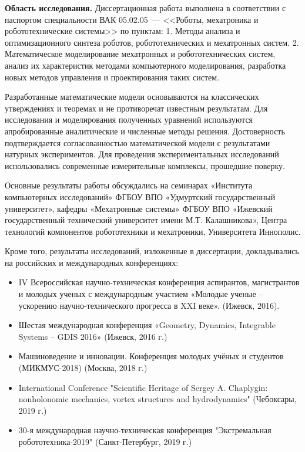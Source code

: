 \textbf{Область исследования.} Диссертационная работа выполнена в соответствии с паспортом специальности ВАК 05.02.05~--- <<Роботы, мехатроника и робототехнические системы>> по пунктам: 1. Методы анализа и оптимизационного синтеза роботов, робототехнических и мехатронных систем. 2. Математическое моделирование мехатронных и робототехнических систем, анализ их характеристик методами компьютерного моделирования, разработка новых методов управления и проектирования таких систем.

{\reliability} Разработанные математические модели основываются на классических утверждениях и теоремах и не противоречат известным результатам. Для исследования и моделирования полученных уравнений используются апробированные аналитические и численные методы решения. Достоверность подтверждается согласованностью математической модели с результатами натурных экспериментов. Для проведения экспериментальных исследований использовались современные измерительные комплексы, прошедшие поверку.


{\probation}
Основные результаты работы обсуждались на семинарах «Института компьютерных исследований» ФГБОУ ВПО «Удмуртский государственный университет», кафедры «Мехатронные системы» ФГБОУ ВПО «Ижевский государственный технический университет имени М.Т. Калашникова», Центра технологий компонентов робототехники и мехатроники, Университета Иннополис.

Кроме того, результаты исследований, изложенные в диссертации, докладывались на российских и международных конференциях:
\begin{itemize}
	\item IV Всероссийская научно-техническая конференция аспирантов, магистрантов и молодых ученых с международным участием «Молодые ученые -- ускорению научно-технического прогресса в XXI веке». (Ижевск, 2016).
	\item Шестая международная конференция «Geometry, Dynamics, Integrable Systems -- GDIS 2016» (Ижевск, 2016 г.)
	\item Машиноведение и инновации. Конференция молодых учёных и студентов (МИКМУС-2018) (Москва, 2018 г.)
	\item International Conference "Scientific Heritage of Sergey A. Chaplygin: nonholonomic mechanics, vortex structures and hydrodynamics" (Чебоксары, 2019 г.)
	\item 30-я международная научно-техническая конференция "Экстремальная робототехника-2019" (Санкт-Петербург, 2019 г.)	
\end{itemize}

